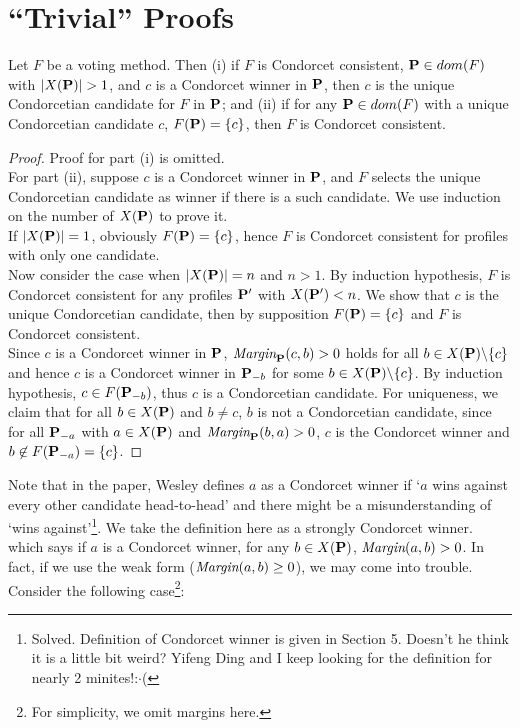 \chapter{``Trivial'' Proofs}

\begin{lemma}
    Let $F$ be a voting method. Then (i) if $F$ is Condorcet consistent, $\mathbf{P} \in dom(F)$ with $|X(\mathbf{P})| > 1$, and $c$ is a Condorcet winner in $\mathbf{P}$, then $c$ is the unique Condorcetian candidate for $F$ in $\mathbf{P}$; and (ii) if for any $\mathbf{P} \in dom(F)$ with a unique Condorcetian candidate $c$, $F(\mathbf{P}) = \{c\}$, then $F$ is Condorcet consistent.
\end{lemma}

\begin{proof}
    Proof for part (i) is omitted.\\
    For part (ii), suppose $c$ is a Condorcet winner in $\mathbf{P}$, and $F$ selects the unique Condorcetian candidate as winner if there is a such candidate. We use induction on the number of $X(\mathbf{P})$ to prove it. \\
    If $|X(\mathbf{P})| = 1$, obviously $F(\mathbf{P}) = \{c\}$, hence $F$ is Condorcet consistent for profiles with only one candidate. \\
    Now consider the case when $|X(\mathbf{P})| = n$ and $n > 1$. By induction hypothesis, $F$ is Condorcet consistent for any profiles $\mathbf{P}'$ with $X(\mathbf{P}') < n$. We show that $c$ is the unique Condorcetian candidate, then by supposition $F(\mathbf{P}) = \{c\}$ and $F$ is Condorcet consistent.\\
    Since $c$ is a Condorcet winner in $\mathbf{P}$, $\textit{Margin}_{\mathbf{P}}(c,b) > 0$ holds for all $b \in X(\mathbf{P}) \backslash \{c\}$ and hence $c$ is a Condorcet winner in $\mathbf{P}_{-b}$ for some $b \in X(\mathbf{P}) \backslash \{c\}$. By induction hypothesis, $c \in F(\mathbf{P}_{-b})$, thus $c$ is a Condorcetian candidate. For uniqueness, we claim that for all $b \in X(\mathbf{P})$ and $b \neq c$, $b$ is not a Condorcetian candidate, since for all $\mathbf{P}_{-a}$ with $a \in X(\mathbf{P})$ and $\textit{Margin}_{\mathbf{P}} (b,a) >0$, $c$ is the Condorcet winner and $b \not \in F(\mathbf{P}_{-a}) = \{c\}$.
\end{proof}

Note that in the paper, Wesley defines $a$ as a Condorcet winner if `$a$ wins against every other candidate head-to-head' and there might be a misunderstanding of `wins against'\footnote{Solved. Definition of Condorcet winner is given in Section 5. Doesn't he think it is a little bit weird? Yifeng Ding and I keep looking for the definition for nearly 2 minites!:$\cdot$(}. We take the definition here as a strongly Condorcet winner. which says if $a$ is a Condorcet winner, for any $b \in X(\mathbf{P})$, $\textit{Margin}(a,b) > 0$. In fact, if we use the weak form ($\textit{Margin}(a,b) \geq 0$), we may come into trouble. Consider the following case\footnote{For simplicity, we omit margins here.}:

